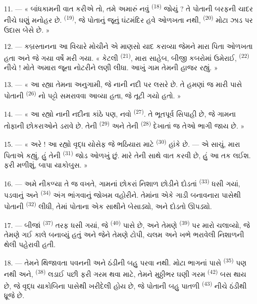 11. --- « બાંધકામની વાત કરીએ તો, તમે અમારું નવું 
\textsuperscript{(18)} જોયું ? તે પોતાની બરફની ચાદર નીચે ઘણું મનોહર છે.
 \textsuperscript{(19)}, જે પોતાનું જૂનું ઘંટમંદિર હવે
ઓળખતા નથી,  \textsuperscript{(20)} મોટા ઝાડ પર
ઉદાસ બેસે છે. »

12. --- કબ્રસ્તાનના આ વિચારે મોચીને એ માણસો યાદ કરાવ્યા જેમને મારા
પિતા ઓળખતા હતા અને જે ગયા વર્ષે મરી ગયા. « કેટલી 
\textsuperscript{(21)}, મારા સાહેબ, બીજી કબરોમાં ઉમેરાઈ,
 \textsuperscript{(22)} નીચે ! મોતે અમારા જૂના
નોટરીને લણી લીધા. આખું ગામ તેમની  હાજર રહ્યું. »

13. --- « આ રહ્યા તેમના અનુગામી, જે નાની નદી પર લસરે છે. તે હમણાં જ
મારી પાસે પોતાની  \textsuperscript{(26)} નો પટ્ટો
સમરાવવા આવ્યા હતા, જે તૂટી ગયો હતો. »

14. --- « આ રહ્યો નાની નદીના કાંઠે પણ, નવો 
\textsuperscript{(27)}. તે ભૂતપૂર્વ સિપાહી છે, જે ગામના તોફાની
છોકરાઓને ડરાવે છે. તેની 
\textsuperscript{(29)} અને તેની  \textsuperscript{(28)}
દેખાતાં જ તેઓ ભાગી જાય છે. »

15. --- « અરે ! આ રહ્યો વૃદ્ધ યોસેફ જે ભઠિયારા માટે  \textsuperscript{(30)} હાંકે છે. --- એ સાચું, મારા
પિતાએ કહ્યું, હું તેની  \textsuperscript{(31)} જોડ
ઓળખું છું. મારે તેની સાથે વાત કરવી છે, હું આ તક લઈશ. ફરી મળીશું, બાપા
યાકોબુસ. »

16. --- અમે નીકળ્યા તે જ વખતે, ગામનાં છોકરાં નિશાળ છોડીને દોડતાં
 \textsuperscript{(33)} ધસી ગયાં, પડવાનું અને
 \textsuperscript{(34)} અંગ ભાંગવાનું જોખમ વહોરીને.
તેમાંના એકે ગાડી બનાવનારા પાસેથી પોતાની 
\textsuperscript{(32)} લીધી, તેમાં પોતાના એક સાથીને બેસાડ્યો, અને દોડતો
ઊપડ્યો.

17. --- બીજાં  \textsuperscript{(37)} તરફ ધસી ગયાં,
જે  \textsuperscript{(40)} પાસે છે, અને તેમણે
 \textsuperscript{(39)} પર મારો ચલાવ્યો, જે તેમણે
ગઈ કાલે બનાવ્યું હતું અને જેને તેમણે ટોપી, ચલમ અને ખભે ભરાવેલી નિશાળની
થેલી પહેરાવી હતી.

18. --- તેમને થિજાવતા પવનની અને ઠંડીની બહુ પરવા નથી. મોટા ભાગનાં પાસે
 \textsuperscript{(35)} પણ નથી અને,
 \textsuperscript{(38)} લડાઈ પછી ફરી ગરમ થવા માટે,
તેમને મુઠ્ઠીભર ઘણી ગરમ  \textsuperscript{(42)} બસ થાય
છે, જે વૃદ્ધ  યાકોબિના પાસેથી ખરીદેલી હોય છે, જે
પોતાની બહુ પાતળી  \textsuperscript{(43)} નીચે ઠંડીથી
ધ્રૂજે છે.

